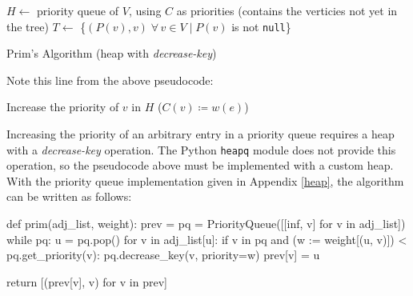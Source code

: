 \documentclass[12pt, titlepage]{article}
\begin{document}
\begin{algorithm}[H]
  \SetAlgoLined
  \DontPrintSemicolon
  $H \longleftarrow$\hspace{0.5mm} priority queue of $V$, using $C$ as priorities\;
  \hspace{13mm}(contains the verticies not yet in the tree)\;
  $T \longleftarrow$\hspace{0.5mm} \{$(P(v), v)\;\forall\,v\in V\mid P(v)$ is not \texttt{null}\}\;
  \;
  \caption{Prim's Algorithm (heap with \textit{decrease-key})}
\end{algorithm} \medskip

Note this line from the above pseudocode:
\begin{center}
Increase the priority of $v$ in $H$\hspace{4mm} ($C(v)\coloneqq w(e)$)
\end{center}
Increasing the priority of an arbitrary entry in a priority queue requires a heap with a \textit{decrease-key} operation. The Python \texttt{heapq} module does not provide this operation, so the pseudocode above must be implemented with a custom heap. With the priority queue implementation given in Appendix \ref{heap}, the algorithm can be written as follows: \medskip

\begin{python}
def prim(adj_list, weight):
    prev = {}
    pq = PriorityQueue([[inf, v] for v in adj_list])
    while pq:
        u = pq.pop()
        for v in adj_list[u]:
            if v in pq and (w := weight[(u, v)]) < pq.get_priority(v):
                pq.decrease_key(v, priority=w)
                prev[v] = u

    return [(prev[v], v) for v in prev]
\end{python}
\end{document}
